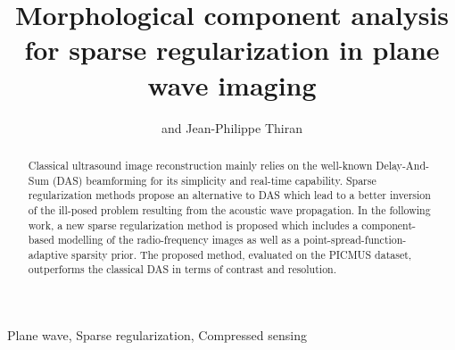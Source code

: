\documentclass[conference]{IEEEtran}
\begin{document}
%
\title{Morphological component analysis for sparse regularization in plane wave imaging}

\author{ and 
Jean-Philippe Thiran
}
\maketitle

\begin{abstract}
Classical ultrasound image reconstruction mainly relies on the well-known Delay-And-Sum (DAS) beamforming for its simplicity and real-time capability. Sparse regularization methods propose an alternative to DAS which lead to a better inversion of the ill-posed problem resulting from the acoustic wave propagation. In the following work, a new sparse regularization method is proposed which includes a component-based modelling of the radio-frequency images as well as a point-spread-function-adaptive sparsity prior. The proposed method, evaluated on the PICMUS dataset, outperforms the classical DAS in terms of contrast and resolution.   
\end{abstract}

\begin{IEEEkeywords}
Plane wave, Sparse regularization, Compressed sensing
\end{IEEEkeywords}
\end{document}
